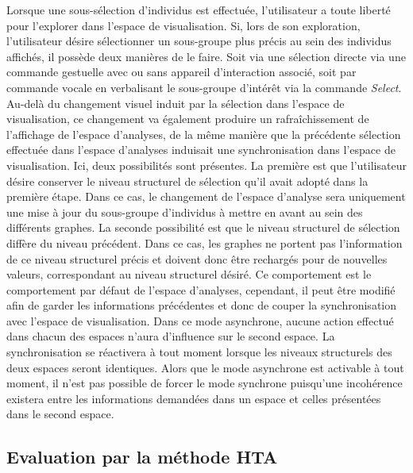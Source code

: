Lorsque une sous-sélection d'individus est effectuée, l'utilisateur a toute liberté pour l'explorer dans l'espace de visualisation. Si, lors de son exploration, l'utilisateur désire sélectionner un sous-groupe plus précis au sein des individus affichés, il possède deux manières de le faire. Soit via une sélection directe via une commande gestuelle avec ou sans appareil d'interaction associé, soit par commande vocale en verbalisant le sous-groupe d’intérêt via la commande \textit{Select}.
Au-delà du changement visuel induit par la sélection dans l'espace de visualisation, ce changement va également produire un rafraîchissement de l'affichage de l'espace d'analyses, de la même manière que la précédente sélection effectuée dans l'espace d'analyses induisait une synchronisation dans l'espace de visualisation. Ici, deux possibilités sont présentes. La première est que l’utilisateur désire conserver le niveau structurel de sélection qu'il avait adopté dans la première étape. Dans ce cas, le changement de l'espace d'analyse sera uniquement une mise à jour du sous-groupe d'individus à mettre en avant au sein des différents graphes. La seconde possibilité est que le niveau structurel de sélection diffère du niveau précédent. Dans ce cas, les graphes ne portent pas l'information de ce niveau structurel précis et doivent donc être rechargés pour de nouvelles valeurs, correspondant au niveau structurel désiré. Ce comportement est le comportement par défaut de l'espace d'analyses, cependant, il peut être modifié afin de garder les informations précédentes et donc de couper la synchronisation avec l'espace de visualisation. Dans ce mode asynchrone, aucune action effectué dans chacun des espaces n'aura d'influence sur le second espace. La synchronisation se réactivera à tout moment lorsque les niveaux structurels des deux espaces seront identiques.
Alors que le mode asynchrone est activable à tout moment, il n'est pas possible de forcer le mode synchrone puisqu'une incohérence existera entre les informations demandées dans un espace et celles présentées dans le second espace.


\subsection{Evaluation par la méthode HTA}


